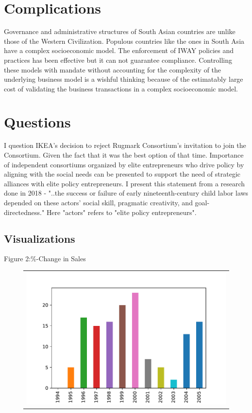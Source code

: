 \documentclass[a4paper, 11pt, margin=1in]{article}
\begin{document}
\section{Complications}
Governance and administrative structures of South Asian countries are unlike those of the Western Civilization. Populous countries like the ones in South Asia have a complex socioeconomic model. 
The enforcement of IWAY policies and practices has been effective but it can not guarantee compliance. Controlling these models with mandate without accounting for the complexity of the underlying business model is a wishful thinking because of the estimatably large cost of validating the business transactions in a complex socioeconomic model.

\section{Questions}
I question IKEA's decision to reject Rugmark Consortium's invitation to join the Consortium. Given the fact that it was the best option of that time. \cite{publichearing1998}
Importance of independent consortiums organized by elite entrepreneurs who drive policy by aligning with the social needs can be presented to support the need of strategic alliances with elite policy entrepreneurs. I present this statement from a research done in 2018 - "..the success or failure of early nineteenth-century child labor laws depended on these actors’ social skill, pragmatic creativity, and goal-directedness." \cite{anderson2018policy} Here "actors" refers to "elite policy entrepreneurs".




\subsection{Visualizations}

Figure 2:\%-Change in Sales\\

\begin{figure}[h]
   \centering
   \begin{tabular}{c}
       \includegraphics[page=1,width=.9\textwidth]{fig2.pdf} \\
   \end{tabular}
\end{figure}
\end{document}
